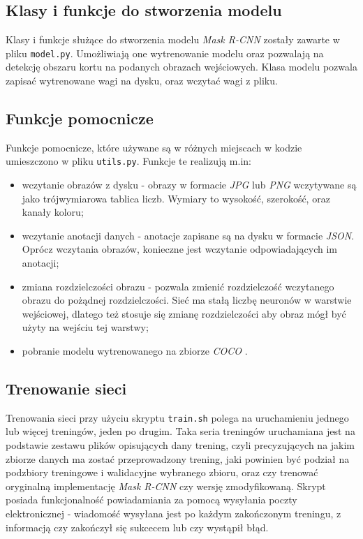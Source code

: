 \subsection*{Klasy i funkcje do stworzenia modelu}
Klasy i funkcje służące do stworzenia modelu \textit{Mask R-CNN} zostały zawarte w pliku \texttt{model.py}. Umożliwiają one wytrenowanie modelu oraz pozwalają na detekcję obszaru kortu na podanych obrazach wejściowych. Klasa modelu pozwala zapisać wytrenowane wagi na dysku, oraz wczytać wagi z pliku.

\subsection*{Funkcje pomocnicze}
Funkcje pomocnicze, które używane są w różnych miejscach w kodzie umieszczono w pliku \texttt{utils.py}.
Funkcje te realizują m.in:

\begin{itemize}
  \item wczytanie obrazów z dysku - obrazy w formacie \textit{JPG} lub \textit{PNG} wczytywane są jako trójwymiarowa tablica liczb. Wymiary to wysokość, szerokość, oraz kanały koloru;
  \item wczytanie anotacji danych - anotacje zapisane są na dysku w formacie \textit{JSON}. Oprócz wczytania obrazów, konieczne jest wczytanie odpowiadających im anotacji;
  \item zmiana rozdzielczości obrazu - pozwala zmienić rozdzielczość wczytanego obrazu do pożądnej rozdzielczości. Sieć ma stałą liczbę neuronów w warstwie wejściowej, dlatego też stosuje się zmianę rozdzielczości aby obraz mógł być użyty na wejściu tej warstwy;
  \item pobranie modelu wytrenowanego na zbiorze \textit{COCO} \cite{coco}.
\end{itemize}

\subsection*{Trenowanie sieci}

Trenowania sieci przy użyciu skryptu \texttt{train.sh} polega na uruchamieniu jednego lub więcej treningów, jeden po drugim. Taka seria treningów uruchamiana jest na podstawie zestawu plików opisujących dany trening, czyli precyzujących na jakim zbiorze danych ma zostać przeprowadzony trening, jaki powinien być podział na podzbiory treningowe i walidacyjne wybranego zbioru, oraz czy trenować oryginalną implementację \textit{Mask R-CNN} czy wersję zmodyfikowaną. Skrypt posiada funkcjonalność powiadamiania za pomocą wysyłania poczty elektronicznej - wiadomość wysyłana jest po każdym zakończonym treningu, z informacją czy zakończył się sukcecem lub czy wystąpił błąd.

